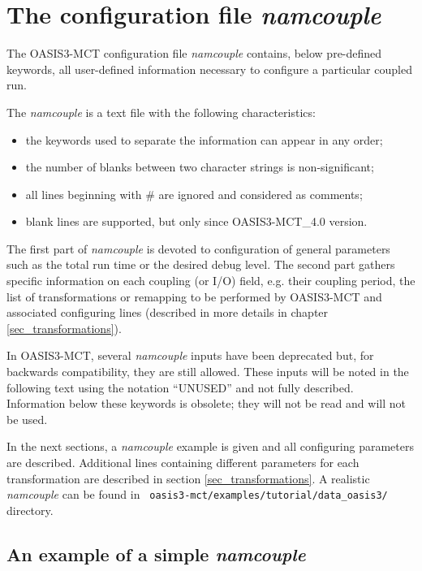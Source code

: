 \newpage
\chapter{The configuration file {\it namcouple}}
\label{sec_namcouple}

The OASIS3-MCT configuration file {\it namcouple} contains, below
pre-defined keywords, all user-defined information necessary to
configure a particular coupled run.

The {\it namcouple} is a text file with the following characteristics:

\begin{itemize}
\item the keywords used to separate the information can appear in any
  order;
\item the number of blanks between two character strings is
  non-significant;
\item all lines beginning with \# are ignored and considered as
  comments;
\item blank lines are supported, but only since OASIS3-MCT\_4.0 version.
\end{itemize}

The first part of {\it namcouple } is devoted to configuration of
general parameters such as the total run time or the desired debug level.  
The second part gathers specific
information on each coupling (or I/O) field, e.g. their coupling
period, the list of transformations or remapping to be performed
by OASIS3-MCT and associated configuring lines (described in more
details in chapter \ref{sec_transformations}).

In OASIS3-MCT, several {\it namcouple} inputs have been deprecated
but, for backwards compatibility, they are still allowed.  These
inputs will be noted in the following text using the notation
``UNUSED'' and not fully described. Information below these keywords
is obsolete; they will not be read and will not be used.

In the next sections, a {\it namcouple} example is given and
all configuring parameters are described. Additional lines
containing different parameters for each transformation
are described in section \ref{sec_transformations}. A realistic {\it
  namcouple} can be found in {\tt
  oasis3-mct/examples/tutorial/data\_oasis3/} directory.

\section{An example of a simple {\it namcouple}}
\label{subsec_examplenamcouple}

